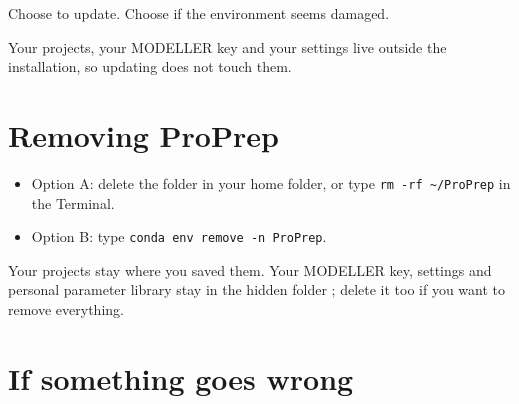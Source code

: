 Choose  to update. Choose  if the environment seems damaged.

Your projects, your MODELLER key and your settings live outside the
installation, so updating does not touch them.

\section{Removing ProPrep}
\label{sec:installation-remove}

\begin{itemize}
  \item Option A: delete the folder  in your home folder, or type
        \texttt{rm -rf \textasciitilde/ProPrep} in the Terminal.
  \item Option B: type \texttt{conda env remove -n ProPrep}.
\end{itemize}

Your projects stay where you saved them. Your MODELLER key, settings and
personal parameter library stay in the hidden folder ; delete
it too if you want to remove everything.

\section{If something goes wrong}
\label{sec:installation-problems}

